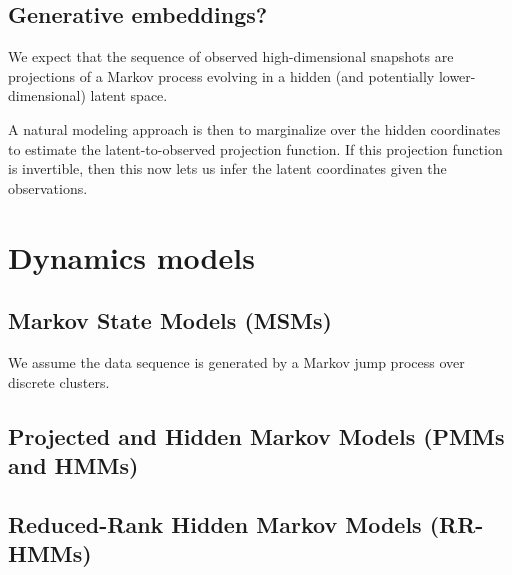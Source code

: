 \documentclass[aps,prl,preprint,nofootinbib,superscriptaddress,linenumbers]{revtex4-1}
\begin{document}
\subsection{Generative embeddings?}
We expect that the sequence of observed high-dimensional snapshots are projections of a Markov process evolving in a hidden (and potentially lower-dimensional) latent space.

A natural modeling approach is then to marginalize over the hidden coordinates to estimate the latent-to-observed projection function. If this projection function is invertible, then this now lets us infer the latent coordinates given the observations.

\section{Dynamics models}
\subsection{Markov State Models (MSMs)}
We assume the data sequence is generated by a Markov jump process over discrete clusters.

\subsection{Projected and Hidden Markov Models (PMMs and HMMs)}



\subsection{Reduced-Rank Hidden Markov Models (RR-HMMs)}
\end{document}
